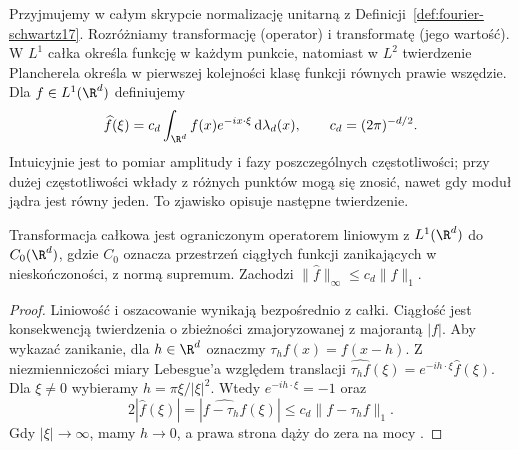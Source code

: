 Przyjmujemy w całym skrypcie normalizację unitarną z
Definicji~\ref{def:fourier-schwartz17}. Rozróżniamy
transformację (operator) i transformatę (jego wartość).
W $L^1$ całka określa funkcję w każdym punkcie, natomiast
w $L^2$ twierdzenie Plancherela określa w pierwszej
kolejności klasę funkcji równych prawie wszędzie.
Dla $f\in L^1(\R^d)$ definiujemy
\[
 \widehat f(\xi)=c_d\int_{\R^d}f(x)e^{-ix\cdot\xi}
 \,\mathrm d\lambda_d(x),\qquad c_d=(2\pi)^{-d/2}.
\]
Intuicyjnie jest to pomiar amplitudy i fazy poszczególnych
częstotliwości; przy dużej częstotliwości wkłady z różnych
punktów mogą się znosić, nawet gdy moduł jądra jest równy
jeden. To zjawisko opisuje następne twierdzenie.

\begin{twierdzenie}
\label{thm:dt-fourier-l1-rl}
Transformacja całkowa jest ograniczonym operatorem
liniowym z $L^1(\R^d)$ do $C_0(\R^d)$, gdzie $C_0$
oznacza przestrzeń ciągłych funkcji zanikających w
nieskończoności, z normą supremum. Zachodzi
$\|\widehat f\|_\infty\le c_d\|f\|_1$.
\end{twierdzenie}
\begin{proof}
Liniowość i oszacowanie wynikają bezpośrednio z całki.
Ciągłość jest konsekwencją twierdzenia o zbieżności
zmajoryzowanej z majorantą $|f|$.
Aby wykazać zanikanie, dla $h\in\R^d$ oznaczmy
$\tau_h f(x)=f(x-h)$. Z niezmienniczości miary
Lebesgue'a względem translacji
$\widehat{\tau_h f}(\xi)=e^{-ih\cdot\xi}\widehat f(\xi)$.
Dla $\xi\ne0$ wybieramy $h=\pi\xi/|\xi|^2$.
Wtedy $e^{-ih\cdot\xi}=-1$ oraz
\[
 2|\widehat f(\xi)|
 =|\widehat{f-\tau_h f}(\xi)|
 \le c_d\|f-\tau_h f\|_1.
\]
Gdy $|\xi|\to\infty$, mamy $h\to0$, a prawa strona
dąży do zera na mocy
.
\end{proof}

